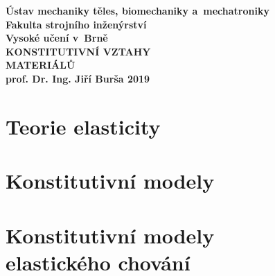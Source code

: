 \documentclass[a4paper, 10pt, oneside]{report}
\numberwithin{equation}{part}
\begin{document}
\begin{titlepage}
\pagecolor{fsimodra}
\color{white}
\renewcommand{\thepage}{Cover}
\centering
\bfseries
{Ústav mechaniky těles, biomechaniky a~mechatroniky\\Fakulta strojního inženýrství\\Vysoké učení v~Brně\\}
\vfill
{\Huge KONSTITUTIVNÍ VZTAHY\\MATERIÁLŮ\\}
\vfill
{\LARGE prof. Dr. Ing. Jiří Burša}
\vfill
2019
\end{titlepage}

\clearpage
\nopagecolor
\color{black}
\tableofcontents

\clearpage
{}
\chapter{Teorie elasticity}


















%

\chapter{Konstitutivní modely}









\chapter{Konstitutivní modely\\elastického chování}


















\end{document}
